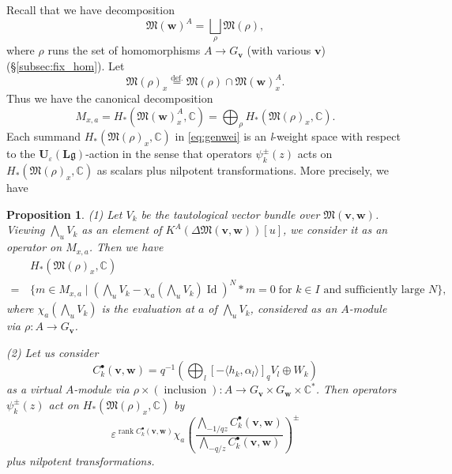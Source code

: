 \documentclass[12pt]{amsart}
\def\Bbb{\mathbb}
\def\frak{\mathfrak}
\newcommand{\rom}{\textup}
\newtheorem{Proposition}[equation]{Proposition}
\theoremstyle{definition}
\theoremstyle{remark}
\numberwithin{equation}{subsection}
\newcommand{\subsecref}[1]{\S\ref{#1}}
\newcommand{\defeq}{\overset{\operatorname{\scriptstyle def.}}{=}}
\newcommand{\C}{{\Bbb C}}
\newcommand{\rank}{\operatorname{rank}}
\newcommand{\M}{{\frak M}} %
\newcommand{\bv}{{\mathbf v}} %
\newcommand{\bw}{{\mathbf w}} %
\newcommand{\Ule}{{\mathbf U}_{\varepsilon}({\mathbf L}\mathfrak g)}
\newcommand{\Wedge}{{\textstyle \bigwedge}}
\newcommand{\Mw}{\M(\bw)}
\begin{document}
Recall that we have decomposition
\begin{equation*}
   \Mw^A = \bigsqcup_\rho \M(\rho),
\end{equation*}
where $\rho$ runs the set of homomorphisms $A\to G_\bv$ (with various
$\bv$) (\subsecref{subsec:fix_hom}). Let
\begin{equation*}
   \M(\rho)_x \defeq \M(\rho)\cap \Mw^A_x.
\end{equation*}
Thus we have the canonical decomposition
\begin{equation}\label{eq:genwei}
   M_{x,a} = H_*(\Mw_x^A,\C)
           = \bigoplus_\rho H_*(\M(\rho)_x,\C).
\end{equation}
Each summand $H_*(\M(\rho)_x,\C)$ in \eqref{eq:genwei} is an
{\it l\/}-weight space with respect to the $\Ule$-action in the
sense that operators $\psi_k^\pm(z)$ acts on $H_*(\M(\rho)_x,\C)$ as
scalars plus nilpotent transformations. More precisely, we have
\begin{Proposition}\label{prop:genweight}
\rom{(1)}
Let $V_k$ be the tautological vector bundle over $\M(\bv,\bw)$.
Viewing $\Wedge_{u} V_k$ as an element of $K^A(\Delta\M(\bv,\bw))[u]$,
we consider it as an operator on $M_{x,a}$. Then we have
\begin{equation*}
\begin{split}
   & H_*(\M(\rho)_x,\C) \\ =\, &
   \{ m\in M_{x,a}\mid\left(
    \Wedge_{u} V_k - \chi_a(\Wedge_{u} V_k)\operatorname{Id}\right)^N
   \ast m = 0\;  \text{for $k\in I$ and sufficiently large $N$}\},
\end{split}
\end{equation*}
where $\chi_a(\Wedge_{u} V_k)$ is the evaluation at $a$ of
$\Wedge_{u} V_k$, considered as an $A$-module via $\rho\colon A\to G_\bv$.

\rom{(2)}
Let us consider
\begin{equation*}
  C_k^\bullet(\bv,\bw) = q^{-1} \left( \displaystyle{\bigoplus_{l}}
     [-\langle h_k,\alpha_l\rangle]_q V_l \oplus W_k\right)
\end{equation*}
as a virtual $A$-module via
$\rho\times(\operatorname{inclusion})\colon A\to G_\bv\times
G_\bw\times\C^*$.
Then operators $\psi_k^\pm(z)$ act on $H_*(\M(\rho)_x,\C)$ by
\begin{equation}\label{eq:genweight}
   \varepsilon^{\rank C_k^\bullet(\bv,\bw)}
   \chi_a\left(\frac{\Wedge_{-1/qz}C_k^\bullet(\bv,\bw)}
        {\Wedge_{-q/z}C_k^\bullet(\bv,\bw)}\right)^\pm
\end{equation}
plus nilpotent transformations.
\end{Proposition}
\end{document}
